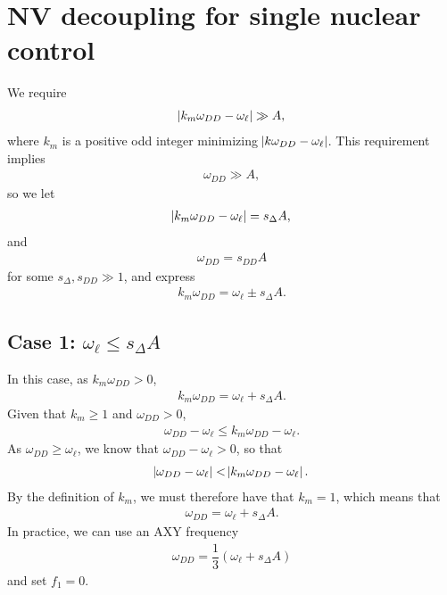 \documentclass[11pt]{article}
\newcommand{\f}[2]{\dfrac{#1}{#2}} %
\newcommand{\p}[1]{\left(#1\right)} %
\renewcommand{\l}{\ell} %
\begin{document}
\newpage
\section*{NV decoupling for single nuclear control}

We require
\begin{align}
  \abs{k_m\omega_{DD}-\omega_\l}\gg A,
\end{align}
where $k_m$ is a positive odd integer minimizing
$\abs{k\omega_{DD}-\omega_\l}$. This requirement implies
\begin{align}
  \omega_{DD}\gg A,
\end{align}
so we let
\begin{align}
  \abs{k_m\omega_{DD}-\omega_\l}=s_\Delta A,
\end{align}
and
\begin{align}
  \omega_{DD}=s_{DD}A
\end{align}
for some $s_\Delta,s_{DD}\gg1$, and express
\begin{align}
  k_m\omega_{DD}=\omega_\l\pm s_\Delta A.
\end{align}

\subsection*{Case 1: $\omega_\l \le s_\Delta A$}
In this case, as $k_m\omega_{DD}>0$,
\begin{align}
  k_m\omega_{DD}=\omega_\l+s_\Delta A.
\end{align}
Given that $k_m\ge 1$ and $\omega_{DD}>0$,
\begin{align}
  \omega_{DD}-\omega_\l\le k_m\omega_{DD}-\omega_\l.
\end{align}
As $\omega_{DD}\ge\omega_\l$, we know that $\omega_{DD}-\omega_\l>0$,
so that
\begin{align}
  \abs{\omega_{DD}-\omega_\l}<\abs{k_m\omega_{DD}-\omega_\l}.
\end{align}
By the definition of $k_m$, we must therefore have that $k_m=1$, which
means that
\begin{align}
  \omega_{DD}=\omega_\l+s_\Delta A.
\end{align}
In practice, we can use an AXY frequency
\begin{align}
  \omega_{DD}=\f13\p{\omega_\l+s_\Delta A}
  \label{w_DD_case1}
\end{align}
and set $f_1=0$.
\end{document}
